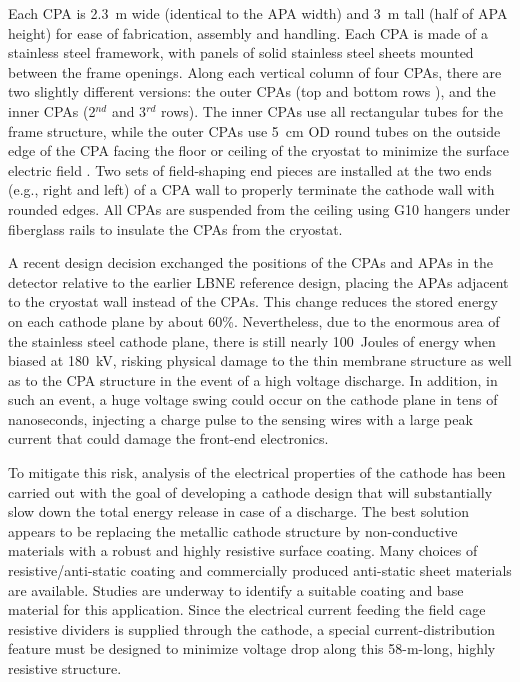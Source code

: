 Each CPA is 2.3~m wide (identical to the APA width) and 3~m tall (half
of APA height) for ease of fabrication, assembly and handling.  Each
CPA is made of a stainless steel framework, with panels of solid
stainless steel sheets mounted between the frame openings.  Along each
vertical column of %
four CPAs, there are two slightly different
versions: the outer CPAs (top and bottom rows ), and the inner CPAs
(2$^{nd}$ and 3$^{rd}$ rows).  The inner CPAs use all rectangular tubes for the
frame structure, while the outer CPAs use 5~cm OD round tubes on the
outside edge of the CPA facing the floor or ceiling of the cryostat to
minimize the surface electric field .  Two sets of field-shaping end
pieces are installed at the two ends (e.g., right and left) of a CPA wall to properly
terminate the cathode wall with rounded edges.  All CPAs are suspended
from the ceiling using G10 hangers under fiberglass rails to insulate
the CPAs from the cryostat.

A recent design decision exchanged the positions of the CPAs and APAs
in the detector relative to the earlier LBNE reference design, placing the APAs adjacent to the cryostat wall
instead of the CPAs. %
This change
reduces the stored energy on each cathode plane by about 60\%.
Nevertheless, due to the enormous area of the stainless steel cathode
plane, there is still nearly 100~Joules of energy when biased at
180~kV, risking physical damage to the thin membrane structure as well
as to the CPA structure in the event of a high voltage discharge.  In
addition, in such an event, a huge voltage swing could occur on the
cathode plane in tens of nanoseconds, injecting a charge pulse to the
sensing wires with a large peak current that could damage the
front-end electronics.

To mitigate this risk, analysis of the electrical properties of the
cathode has been carried out with the goal of developing a cathode
design that will substantially slow down the total energy release in
case of a discharge.  The best solution appears to be replacing the
metallic cathode structure by non-conductive materials with a robust
and highly resistive surface coating.  Many choices of 
resistive/anti-static coating and commercially produced
anti-static sheet materials are available.  Studies are underway to identify a
suitable coating and base material for this application.  Since the
electrical current feeding the field cage resistive dividers is
supplied through the cathode, a special current-distribution feature
must be designed to minimize voltage drop along this 58-m-long, highly
resistive structure.


